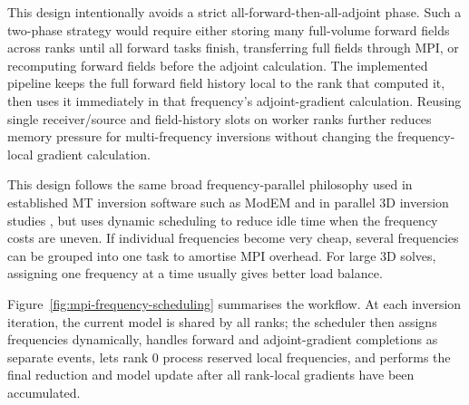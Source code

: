 \documentclass{article}
\begin{document}
This design intentionally avoids a strict all-forward-then-all-adjoint phase. Such a two-phase strategy would require either storing many full-volume forward fields across ranks until all forward tasks finish, transferring full fields through MPI, or recomputing forward fields before the adjoint calculation. The implemented pipeline keeps the full forward field history local to the rank that computed it, then uses it immediately in that frequency's adjoint-gradient calculation. Reusing single receiver/source and field-history slots on worker ranks further reduces memory pressure for multi-frequency inversions without changing the frequency-local gradient calculation.

This design follows the same broad frequency-parallel philosophy used in established MT inversion software such as ModEM \citep{EgbertKelbert2012,KelbertEtAl2014} and in parallel 3D inversion studies \citep{GrayverEtAl2015}, but uses dynamic scheduling to reduce idle time when the frequency costs are uneven. If individual frequencies become very cheap, several frequencies can be grouped into one task to amortise MPI overhead. For large 3D solves, assigning one frequency at a time usually gives better load balance.

Figure~\ref{fig:mpi-frequency-scheduling} summarises the workflow. At each inversion iteration, the current model is shared by all ranks; the scheduler then assigns frequencies dynamically, handles forward and adjoint-gradient completions as separate events, lets rank 0 process reserved local frequencies, and performs the final reduction and model update after all rank-local gradients have been accumulated.
\end{document}

